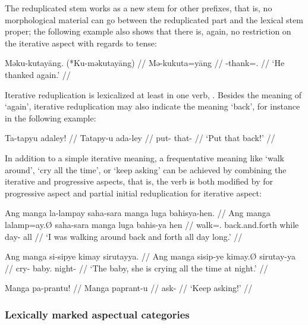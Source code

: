The reduplicated stem works as a new stem for other prefixes, that is, no 
morphological material can go between the reduplicated part and the lexical 
stem proper; the following example also shows that there is, again, no 
restriction on the iterative aspect with regards to tense:

\ex\begingl
	\gla Məku-kutayāng. \quad \textup{(*}Ku-məkutayāng\textup{)} //
	\glb Mə-ku\til{}kuta=yāng //
	\glc \Pst{}-\Iter{}\til{}thank=\TsgM{}.\Aarg{} //
	\glft `He thanked again.' //
\endgl\xe

Iterative reduplication is lexicalized at least in one verb, 
. Besides the meaning of `again', iterative 
reduplication may also indicate the meaning `back', for instance in the 
following example:

\ex\begingl
	\gla Ta-tapyu adaley! //
	\glb Ta\til{}tapy-u ada-ley //
	\glc \Iter{}\til{}put-\Imp{} that-\PargI{} //
	\glft `Put that back!' //
\endgl\xe

In addition to a simple iterative meaning, a frequentative meaning like `walk 
around', `cry all the time', or `keep asking' can be achieved by combining the 
iterative and progressive aspects, that is, the verb is both modified by 
 for progressive aspect and partial initial reduplication for 
iterative aspect:

\pex
\a\begingl
	\gla Ang manga la-lampay saha-sara manga luga bahisya-hen. //
	\glb Ang manga la\til{}lamp=ay.Ø saha-sara manga luga {bahis-ya hen} //
	\glc \AgtT{} \Prog{} \Iter{}\til{}walk=\Fsg{}.\Top{} back.and.forth 
		\Dyn{} while {day-\Loc{} all} //
	\glft `I was walking around back and forth all day long.' //
\endgl

\a\begingl
	\gla Ang manga si-sipye kimay sirutayya. //
	\glb Ang manga si\til{}sip-ye kimay.Ø sirutay-ya //
	\glc \AgtT{} \Prog{} \Iter{}\til{}cry-\TsgF{} baby.\Top{} 
		night-\Loc{} //
	\glft `The baby, she is crying all the time at night.' //
\endgl

\a\begingl
	\gla Manga pa-prantu! //
	\glb Manga pa\til{}prant-u //
	\glc \Prog{} \Iter{}\til{}ask-\Imp{} //
	\glft `Keep asking!' //
\endgl

\xe


\subsubsection{Lexically marked aspectual categories}

